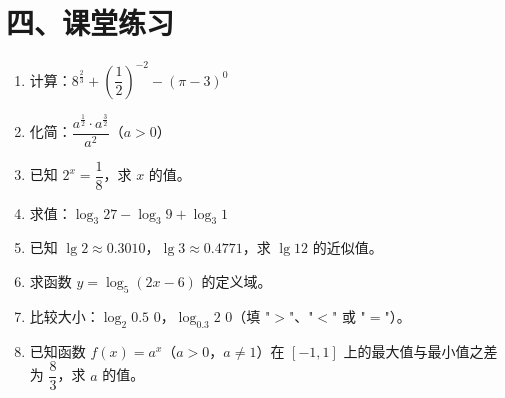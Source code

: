 \documentclass[12pt, a4paper]{ctexart}
\begin{document}
\section*{\textcolor{tipgreen}{四、课堂练习}}

\begin{enumerate}[leftmargin=2em, label=\textbf{\arabic*.}]
  \item 计算：$8^{\frac{2}{3}} + \left(\dfrac{1}{2}\right)^{-2} - (\pi - 3)^{0}$

  \item 化简：$\dfrac{a^{\frac{1}{2}} \cdot a^{\frac{3}{2}}}{a^2}$（$a>0$）

  \item 已知 $2^x = \dfrac{1}{8}$，求 $x$ 的值。

  \item 求值：$\log_3 27 - \log_3 9 + \log_3 1$

  \item 已知 $\lg 2 \approx 0.3010$，$\lg 3 \approx 0.4771$，求 $\lg 12$ 的近似值。

  \item 求函数 $y = \log_5(2x-6)$ 的定义域。

  \item 比较大小：$\log_2 0.5$ \underline{\qquad} $0$，$\log_{0.3} 2$ \underline{\qquad} $0$（填 "$>$"、"$<$" 或 "$=$"）。

  \item 已知函数 $f(x)=a^x$（$a>0$，$a\neq 1$）在 $[-1,1]$ 上的最大值与最小值之差为 $\dfrac{8}{3}$，求 $a$ 的值。
\end{enumerate}
\end{document}
